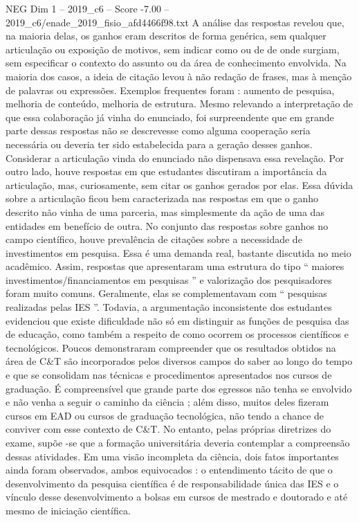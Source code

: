 \begin{textsample}{NEG Dim 1 – 2019\_c6 – Score -7.00 – 2019\_c6/enade\_2019\_fisio\_afd4466f98.txt}
A análise das respostas revelou que, na maioria delas, os ganhos eram descritos de forma genérica, sem qualquer articulação ou exposição de motivos, sem indicar como ou de de onde surgiam, sem especificar o contexto do assunto ou da área de conhecimento envolvida.
Na maioria dos casos, a ideia de citação levou à não redação de frases, mas à menção de palavras ou expressões.
Exemplos frequentes foram : aumento de pesquisa, melhoria de conteúdo, melhoria de estrutura.
Mesmo relevando a interpretação de que essa colaboração já vinha do enunciado, foi surpreendente que em grande parte dessas respostas não se descrevesse como alguma cooperação seria necessária ou deveria ter sido estabelecida para a geração desses ganhos.
Considerar a articulação vinda do enunciado não dispensava essa revelação.
Por outro lado, houve respostas em que estudantes discutiram a importância da articulação, mas, curiosamente, sem citar os ganhos gerados por elas.
Essa dúvida sobre a articulação ficou bem caracterizada nas respostas em que o ganho descrito não vinha de uma parceria, mas simplesmente da ação de uma das entidades em benefício de outra.
No conjunto das respostas sobre ganhos no campo científico, houve prevalência de citações sobre a necessidade de investimentos em pesquisa.
Essa é uma demanda real, bastante discutida no meio acadêmico.
Assim, respostas que apresentaram uma estrutura do tipo “ maiores investimentos/financiamentos em pesquisas ” e valorização dos pesquisadores foram muito comuns.
Geralmente, elas se complementavam com “ pesquisas realizadas pelas IES ”.
Todavia, a argumentação inconsistente dos estudantes evidenciou que existe dificuldade não só em distinguir as funções de pesquisa das de educação, como também a respeito de como ocorrem os processos científicos e tecnológicos.
Poucos demonstraram compreender que os resultados obtidos na área de C\&T são incorporados pelos diversos campos do saber ao longo do tempo e que se consolidam nas técnicas e procedimentos apresentados nos cursos de graduação.
É compreensível que grande parte dos egressos não tenha se envolvido e não venha a seguir o caminho da ciência ; além disso, muitos deles fizeram cursos em EAD ou cursos de graduação tecnológica, não tendo a chance de conviver com esse contexto de C\&T.
No entanto, pelas próprias diretrizes do exame, supõe -se que a formação universitária deveria contemplar a compreensão dessas atividades.
Em uma visão incompleta da ciência, dois fatos importantes ainda foram observados, ambos equivocados : o entendimento tácito de que o desenvolvimento da pesquisa científica é de responsabilidade única das IES e o vínculo desse desenvolvimento a bolsas em cursos de mestrado e doutorado e até mesmo de iniciação científica.

\end{textsample}
